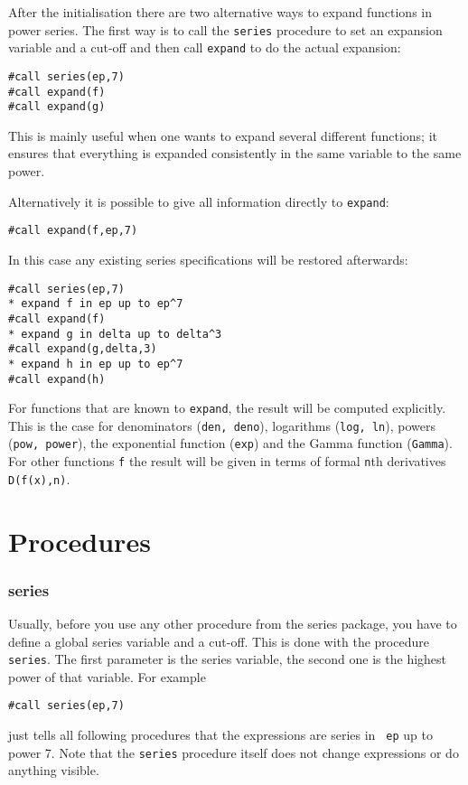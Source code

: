 \documentclass[titlepage]{article}
\begin{document}
After the initialisation there are two alternative ways to expand
functions in power series. The first way is to call the {\tt series}
procedure to set an expansion variable and a cut-off and then call
{\tt expand} to do the actual expansion:
\begin{verbatim}
#call series(ep,7)
#call expand(f)
#call expand(g)
\end{verbatim}
This is mainly useful when one wants to expand several different functions; it
ensures that everything is expanded consistently in the same variable to
the same power.

Alternatively it is possible to give all information
directly to {\tt expand}:
\begin{verbatim}
#call expand(f,ep,7)
\end{verbatim}
In this case any existing series specifications will be restored
afterwards:
\begin{verbatim}
#call series(ep,7)
* expand f in ep up to ep^7
#call expand(f)
* expand g in delta up to delta^3
#call expand(g,delta,3)
* expand h in ep up to ep^7
#call expand(h)
\end{verbatim}


For functions that are known to {\tt expand}, the result will be
computed explicitly. This is the case for denominators ({\tt den,
deno}), logarithms ({\tt log, ln}), powers ({\tt pow, power}), the
exponential function ({\tt exp}) and the Gamma function ({\tt Gamma}).
For other functions {\tt f} the result will be given in terms of formal
{\tt n}th derivatives {\tt D(f(x),n)}.

\section{Procedures}
\label{sec:proc}


\subsubsection{series}
\label{sec:series}

Usually, before you use any other procedure from the series package, you have to
define a global series variable and a cut-off. This is done with the
procedure {\tt series}. The first parameter is the series variable, the
second one is the highest power of that variable. For example
\begin{verbatim}
#call series(ep,7)
\end{verbatim}
just tells all following procedures that the expressions are series in {\tt
  ep} up to power 7. Note that the {\tt series} procedure itself does
not change expressions or do anything visible.
\end{document}
